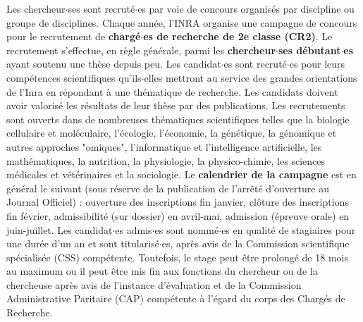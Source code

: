 Les chercheur$\cdot$ses sont recrut\'e$\cdot$es par voie de concours organis\'es par discipline ou groupe de disciplines.  Chaque ann\'ee, l'INRA organise une campagne de concours pour le recrutement de {\bf charg\'e$\cdot$es de recherche de 2e classe (CR2)}. Le recrutement s'effectue, en r\`egle g\'en\'erale, parmi les {\bf chercheur$\cdot$ses d\'ebutant$\cdot$es} ayant soutenu une th\`ese depuis peu. Les candidat$\cdot$es sont recrut\'e$\cdot$es pour leurs comp\'etences scientifiques qu'ils$\cdot$elles mettront au service des grandes orientations de l'Inra en r\'epondant \`a une th\'ematique de recherche. Les candidats doivent avoir valoris\'e les r\'esultats de leur th\`ese par des publications. Les recrutements sont ouverts dans de nombreuses th\'ematiques scientifiques telles que la biologie cellulaire et mol\'eculaire, l'\'ecologie, l'\'economie, la g\'en\'etique, la g\'enomique et autres approches "omiques", l'informatique et l'intelligence artificielle, les math\'ematiques, la nutrition, la physiologie, la physico-chimie, les sciences m\'edicales et v\'et\'erinaires et la sociologie. Le {\bf calendrier de la campagne} est en g\'en\'eral le suivant (sous r\'eserve de la publication de l'arr\^et\'e d'ouverture au Journal Officiel) : ouverture des inscriptions fin janvier, cl\^oture des inscriptions fin f\'evrier, admissibilit\'e (sur dossier) en avril-mai, admission (\'epreuve orale) en juin-juillet. Les candidat$\cdot$es admis$\cdot$es sont nomm\'e$\cdot$es en qualit\'e de stagiaires pour une dur\'ee d'un an et sont titularis\'e$\cdot$es, apr\`es avis de la Commission scientifique sp\'ecialis\'ee (CSS) comp\'etente. Toutefois, le stage peut \^etre prolong\'e de 18 mois au maximum ou il peut \^etre mis fin aux fonctions du chercheur ou de la chercheuse apr\`es avis de l'instance d'\'evaluation et de la Commission Administrative Paritaire (CAP) comp\'etente \`a l'\'egard du corps des Charg\'es de Recherche.\\


